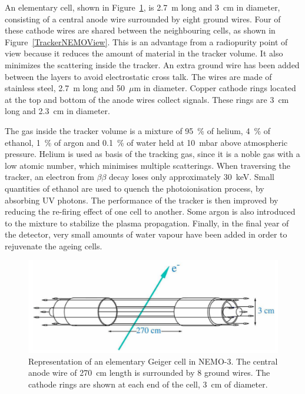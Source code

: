 \documentclass[main.tex]{subfiles}
\begin{document}
\NI An elementary cell, shown in Figure~\ref{GeigerCellNEMO3}, is 2.7~m long and 3~cm in diameter, consisting of a central anode wire surrounded by eight ground wires. Four of these cathode wires are shared between the neighbouring cells, as shown in Figure~\ref{TrackerNEMOView}. This is an advantage from a radiopurity point of view because it reduces the amount of material in the tracker volume. It also minimizes the scattering inside the tracker. An extra ground wire has been added between the layers to avoid electrostatic cross talk. The wires are made of stainless steel, 2.7~m long and 50~$\mu$m in diameter. Copper cathode rings located at the top and bottom of the anode wires collect signals. These rings are 3~cm long and 2.3~cm in diameter.


\bigskip


\NI The gas inside the tracker volume is a mixture of 95~\% of helium, 4~\% of ethanol, 1~\% of argon and 0.1~\% of water held at 10~mbar above atmospheric pressure. Helium is used as basis of the tracking gas, since it is a noble gas with a low atomic number, which minimises multiple scatterings. When traversing the tracker, an electron from $\beta\beta$ decay loses only approximately 30~keV. Small quantities of ethanol are used to quench the photoionisation process, by absorbing UV photons. The performance of the tracker is then improved by reducing the re-firing effect of one cell to another. Some argon is also introduced to the mixture to stabilize the plasma propagation. Finally, in the final year of the detector, very small amounts of water vapour have been added in order to rejuvenate the ageing cells.



\begin{figure}[h!]
\begin{center}
\includegraphics[scale=0.3]{pictures/Chap3/GeigerCellNEMO3.png}
\caption{Representation of an elementary Geiger cell in NEMO-3. The central anode wire of 270~cm length is surrounded by 8 ground wires. The cathode rings are shown at each end of the cell, 3~cm of diameter.}
\label{GeigerCellNEMO3}
\end{center}
\end{figure}
\end{document}
